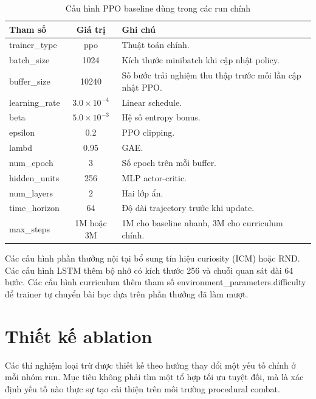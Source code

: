 \begin{table}[H]
    \centering
    \small
    \caption{Cấu hình PPO baseline dùng trong các run chính}
    \label{tab:ppo_baseline_config}
    \begin{tabular}{|p{4cm}|c|p{7cm}|}
        \hline
        \textbf{Tham số} & \textbf{Giá trị} & \textbf{Ghi chú} \\
        \hline
        trainer\_type & ppo & Thuật toán chính. \\
        \hline
        batch\_size & 1024 & Kích thước minibatch khi cập nhật policy. \\
        \hline
        buffer\_size & 10240 & Số bước trải nghiệm thu thập trước mỗi lần cập nhật PPO. \\
        \hline
        learning\_rate & $3.0 \times 10^{-4}$ & Linear schedule. \\
        \hline
        beta & $5.0 \times 10^{-3}$ & Hệ số entropy bonus. \\
        \hline
        epsilon & 0.2 & PPO clipping. \\
        \hline
        lambd & 0.95 & GAE. \\
        \hline
        num\_epoch & 3 & Số epoch trên mỗi buffer. \\
        \hline
        hidden\_units & 256 & MLP actor-critic. \\
        \hline
        num\_layers & 2 & Hai lớp ẩn. \\
        \hline
        time\_horizon & 64 & Độ dài trajectory trước khi update. \\
        \hline
        max\_steps & 1M hoặc 3M & 1M cho baseline nhanh, 3M cho curriculum chính. \\
        \hline
    \end{tabular}
\end{table}

Các cấu hình phần thưởng nội tại bổ sung tín hiệu curiosity (ICM) hoặc RND. Các cấu hình LSTM thêm bộ nhớ có kích thước 256 và chuỗi quan sát dài 64 bước. Các cấu hình curriculum thêm tham số environment\_parameters.difficulty để trainer tự chuyển bài học dựa trên phần thưởng đã làm mượt.

\section{Thiết kế ablation}

Các thí nghiệm loại trừ được thiết kế theo hướng thay đổi một yếu tố chính ở mỗi nhóm run. Mục tiêu không phải tìm một tổ hợp tối ưu tuyệt đối, mà là xác định yếu tố nào thực sự tạo cải thiện trên môi trường procedural combat.

